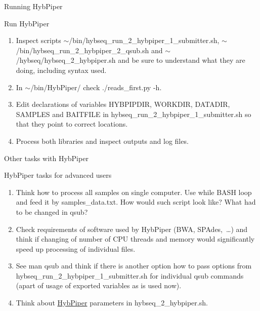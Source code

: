 \documentclass[compress, ucs, xelatex, 11pt, xcolor=x11names, aspectratio=169,
	hyperref={
		bookmarks=true,
		unicode=true,
		colorlinks=true,
		pdftitle={HybSeq course},
		plainpages=false,
		pdfauthor={Vojtech Zeisek},
		pdfsubject={Practical processing of HybSeq target enrichment sequencing data on computing grids like MetaCentrum},
		pdfcreator={XeLaTeX},
		pdfkeywords={BASH, command line, GNU, HybSeq, Linux, MetaCentrum, sequencing shell, target enrichment},
		linkcolor=Cyan2, %
		anchorcolor=Firebrick2, %
		citecolor=Firebrick2, %
		filecolor=Firebrick2, %
		menucolor=Firebrick2, %
		urlcolor=Chartreuse2, %
		pdftex},
	url={hyphens, lowtilde} %
	]{beamer}
\renewcommand{\texttt}[1]{\colorbox{Snow4}{{\ttfamily #1}}}
\begin{document}
\begin{frame}{Running HybPiper}
	\begin{exampleblock}{Run HybPiper}
		\begin{enumerate}
			\item Inspect scripts \texttt{$\sim$/bin/hybseq\_run\_2\_hybpiper\_1\_submitter.sh}, \texttt{$\sim$/bin/hybseq\_run\_2\_hybpiper\_2\_qsub.sh} and \texttt{$\sim$/hybseq/hybseq\_2\_hybpiper.sh} and be sure to understand what they are doing, including syntax used.
			\item In \texttt{$\sim$/bin/HybPiper/} check \texttt{./reads\_first.py -h}.
			\item Edit declarations of variables \texttt{HYBPIPDIR}, \texttt{WORKDIR}, \texttt{DATADIR}, \texttt{SAMPLES} and \texttt{BAITFILE} in \texttt{hybseq\_run\_2\_hybpiper\_1\_submitter.sh} so that they point to correct locations.
			\item Process both libraries and inspect outputs and log files.
		\end{enumerate}
	\end{exampleblock}
\end{frame}

\begin{frame}{Other tasks with HybPiper}
	\begin{exampleblock}{HybPiper tasks for advanced users}
		\begin{enumerate}
			\item Think how to process all samples on single computer. Use \texttt{while} BASH loop and feed it by \texttt{samples\_data.txt}. How would such script look like? What had to be changed in \texttt{qsub}?
			\item Check requirements of software used by HybPiper (BWA, SPAdes,~\ldots) and think if changing of number of CPU threads and memory would significantly speed up processing of individual files.
			\item See \texttt{man qsub} and think if there is another option how to pass options from \texttt{hybseq\_run\_2\_hybpiper\_1\_submitter.sh} for individual \texttt{qsub} commands (apart of usage of exported variables as is used now).
			\item Think about \href{https://github.com/mossmatters/HybPiper/wiki}{HybPiper} parameters in \texttt{hybseq\_2\_hybpiper.sh}.
		\end{enumerate}
	\end{exampleblock}
\end{frame}
\end{document}
